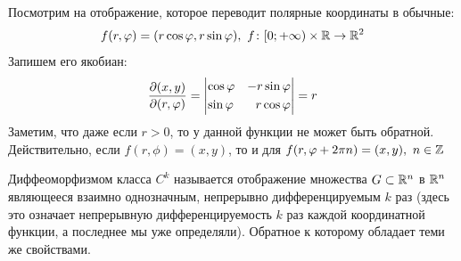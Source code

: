 \begin{example}
	Посмотрим на отображение, которое переводит полярные координаты в обычные:
	\[
		f(r, \varphi) = (r\cos\varphi, r\sin\varphi),\ f \colon [0; +\infty) \times \mathbb{R} \to \mathbb{R}^2
	\]
	Запишем его якобиан:
	\[
		\frac{\partial (x, y)}{\partial (r, \varphi)} = \left|\begin{aligned}&{\cos\varphi} &{-r\sin\varphi} \\ &{\sin\varphi} &{r\cos\varphi}\end{aligned}\right| = r
	\]
	Заметим, что даже если $r > 0$, то у данной функции не может быть обратной. Действительно, если $f(r, \phi) = (x, y)$, то и для $f(r, \varphi + 2\pi n) = (x, y),\ n \in \mathbb{Z}$
\end{example}

\begin{definition}
	Диффеоморфизмом класса $C^k$  называется отображение множества $G\subset\mathbb{R}^n$ в $\mathbb{R}^n$ являющееся взаимно однозначным, непрерывно дифференцируемым $k$ раз (здесь это означает непрерывную дифференцируемость $k$ раз каждой координатной функции, а последнее мы уже определяли). Обратное к которому обладает теми же свойствами.
\end{definition}